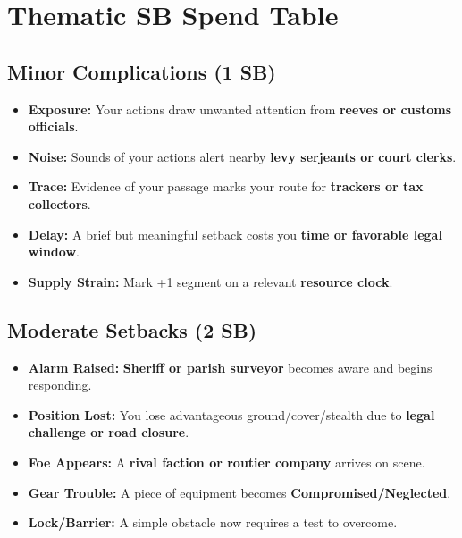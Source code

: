 
\section*{Thematic SB Spend Table}
\label{sec:viterra-sb}

\subsection*{Minor Complications (1 SB)}
\begin{itemize}
\item \textbf{Exposure:} Your actions draw unwanted attention from \textbf{reeves or customs officials}.
\item \textbf{Noise:} Sounds of your actions alert nearby \textbf{levy serjeants or court clerks}.
\item \textbf{Trace:} Evidence of your passage marks your route for \textbf{trackers or tax collectors}.
\item \textbf{Delay:} A brief but meaningful setback costs you \textbf{time or favorable legal window}.
\item \textbf{Supply Strain:} Mark +1 segment on a relevant \textbf{resource clock}.
\end{itemize}

\subsection*{Moderate Setbacks (2 SB)}
\begin{itemize}
\item \textbf{Alarm Raised:} \textbf{Sheriff or parish surveyor} becomes aware and begins responding.
\item \textbf{Position Lost:} You lose advantageous ground/cover/stealth due to \textbf{legal challenge or road closure}.
\item \textbf{Foe Appears:} A \textbf{rival faction or routier company} arrives on scene.
\item \textbf{Gear Trouble:} A piece of equipment becomes \textbf{Compromised/Neglected}.
\item \textbf{Lock/Barrier:} A simple obstacle now requires a test to overcome.
\end{itemize}

